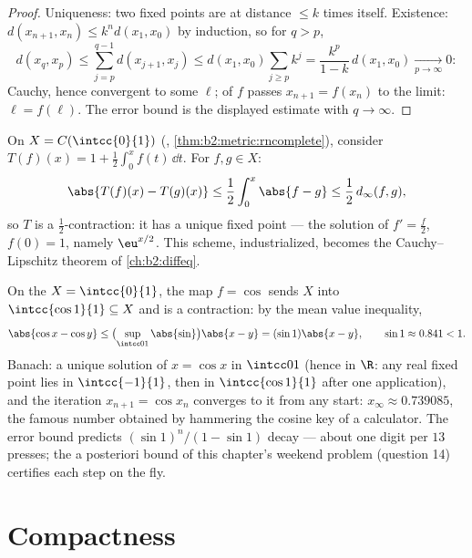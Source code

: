 \begin{proof}
Uniqueness: two fixed points are at distance $\leq k$ times itself.
Existence: $d(x_{n+1}, x_n) \leq k^n d(x_1, x_0)$ by induction, so
for $q > p$,
\[
d(x_q, x_p) \leq \sum_{j=p}^{q-1} d(x_{j+1}, x_j)
\leq d(x_1, x_0) \sum_{j \geq p} k^j
= \frac{k^p}{1-k}\, d(x_1, x_0) \xrightarrow[p\to\infty]{} 0 :
\]
Cauchy, hence convergent to some $\ell$;  of $f$ passes
$x_{n+1} = f(x_n)$ to the limit: $\ell = f(\ell)$. The error bound
is the displayed estimate with $q \to \infty$.
\end{proof}

\begin{example}\label{ex:b2:metric:integralequation}
On $X = C(\intcc{0}{1})$ (,
\cref{thm:b2:metric:rncomplete}), consider $T(f)(x) = 1 + \frac12
\int_0^x f(t)\,\dd t$. For $f, g \in X$:
\[
\abs{T(f)(x) - T(g)(x)} \leq \frac12 \int_0^x \abs{f - g} \leq
\frac12\, d_\infty(f, g),
\]
so $T$ is a $\frac12$-contraction: it has a unique  fixed
point --- the solution of $f' = \frac f2$, $f(0) = 1$, namely
$\eu^{x/2}$. This scheme, industrialized, becomes the
Cauchy--Lipschitz theorem of \cref{ch:b2:diffeq}.
\end{example}

\begin{example}[A numerical fixed point: $x = \cos x$]\label{ex:b2:metric:cosfix}
On the  $X = \intcc{0}{1}$, the map $f = \cos$ sends $X$
into $\intcc{\cos 1}{1} \subseteq X$ and is a contraction: by the
mean value inequality,
\[
\abs{\cos x - \cos y} \leq \bigl(\sup_{\intcc01}\abs{\sin}\bigr)
\abs{x - y} = (\sin 1)\abs{x - y},
\qquad \sin 1 \approx 0.841 < 1 .
\]
Banach: a unique solution of $x = \cos x$ in $\intcc01$ (hence in
$\R$: any real fixed point lies in $\intcc{-1}{1}$, then in
$\intcc{\cos 1}{1}$ after one application), and the iteration
$x_{n+1} = \cos x_n$ converges to it from any start: $x_\infty
\approx 0.739085$, the famous number obtained by hammering the
cosine key of a calculator. The error bound predicts
$(\sin1)^n/(1 - \sin1)$ decay --- about one digit per $13$
presses; the a posteriori bound of this chapter's weekend
problem (question 14) certifies each step on the fly.
\end{example}

\section{Compactness}

